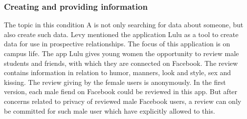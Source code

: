 \subsubsection{Creating and providing information}
The topic in this condition A is not only searching for data about someone, but also create such data. Levy \cite{levy2014intimate} mentioned the application Lulu as a tool to create data for use in prospective relationships. The focus of this application is on campus life. The app Lulu gives young women the opportunity to review male students and friends, with which they are connected on Facebook. The review contains information in relation to humor, manners, look and style, sex and kissing. The review giving by the female users is anonymously. In the first version, each male fiend on Facebook could be reviewed in this app. But after concerns related to privacy of reviewed male Facebook users, a review can only be committed for such male user which have explicitly allowed to this.

